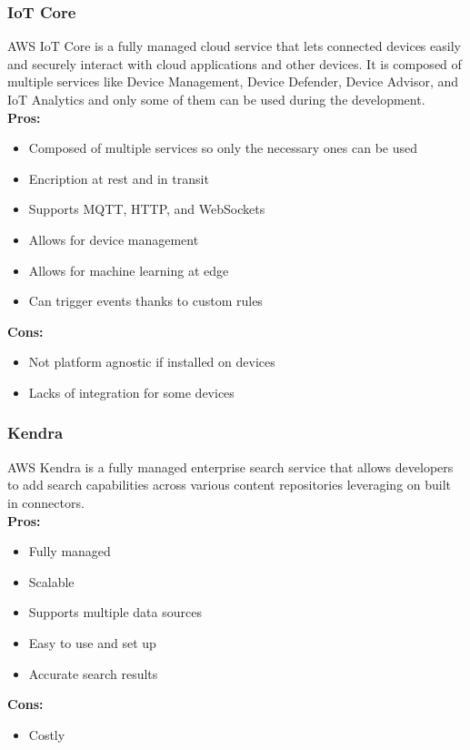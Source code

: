         \subsubsection{IoT Core}
        \label{aws:iot-core}
        AWS IoT Core is a fully managed cloud service that lets connected devices easily and securely interact with cloud applications and other devices.
        It is composed of multiple services like Device Management, Device Defender, Device Advisor, and IoT Analytics and only some of them can be used during the development.\\
        \textbf{Pros:}
        \begin{itemize}
            \item Composed of multiple services so only the necessary ones can be used
            \item Encription at rest and in transit
            \item Supports MQTT, HTTP, and WebSockets
            \item Allows for device management
            \item Allows for machine learning at edge
            \item Can trigger events thanks to custom rules
        \end{itemize}
        \textbf{Cons:}
        \begin{itemize}
            \item Not platform agnostic if installed on devices
            \item Lacks of integration for some devices
        \end{itemize}       

        \subsubsection{Kendra}
        \label{aws:kendra}
        AWS Kendra is a fully managed enterprise search service that allows developers to add search capabilities across various content repositories leveraging on built in connectors.\\
        \textbf{Pros:}
        \begin{itemize}
            \item Fully managed
            \item Scalable
            \item Supports multiple data sources
            \item Easy to use and set up
            \item Accurate search results
        \end{itemize}
        \textbf{Cons:}
        \begin{itemize}
            \item Costly
        \end{itemize}

